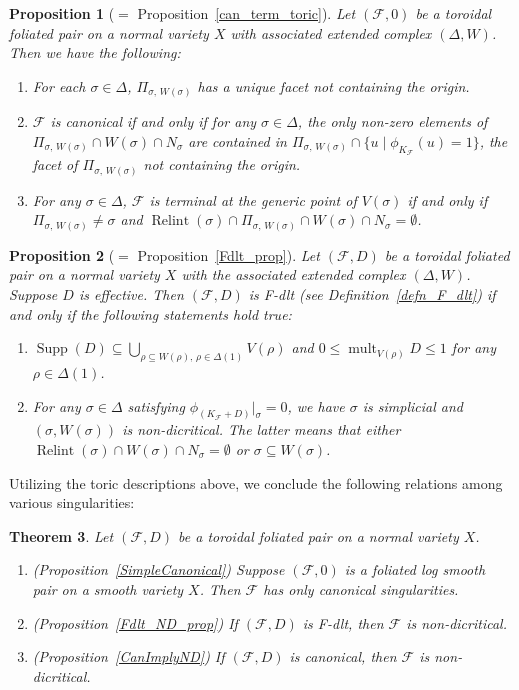 \documentclass[12pt,reqno]{amsart}
\newtheorem{theorem}{Theorem}[section]
\newtheorem{proposition}[theorem]{Proposition}
\theoremstyle{definition}
\newcommand{\on}{\operatorname}
\newcommand\cF{{\mathcal{F}}}
\begin{document}
\begin{proposition}[{$=$ Proposition~\ref{can_term_toric}}]
    Let $(\cF,0)$ be a toroidal foliated pair on a normal variety $X$ with associated extended complex $(\Delta,W)$. 
    Then we have the following:
    \begin{enumerate}
        \item For each $\sigma\in\Delta$, $\Pi_{\sigma,\,W(\sigma)}$ has a unique facet not containing the origin. 
        \item $\cF$ is canonical if and only if for any $\sigma\in\Delta$, the only non-zero elements of $\Pi_{\sigma,\,W(\sigma)}\cap W(\sigma)\cap N_\sigma$ are contained in $\Pi_{\sigma,\,W(\sigma)}\cap\{u\mid\phi_{K_\cF}(u)=1\}$, the facet of $\Pi_{\sigma,\,W(\sigma)}$ not containing the origin. 
        \item For any $\sigma\in\Delta$, $\cF$ is terminal at the generic point of $V(\sigma)$ if and only if $\Pi_{\sigma,\,W(\sigma)}\neq\sigma$ and $\on{Relint}(\sigma)\cap\Pi_{\sigma,\,W(\sigma)}\cap W(\sigma)\cap N_\sigma=\emptyset$. 
    \end{enumerate}
\end{proposition}

\begin{proposition}[{$=$ Proposition~\ref{Fdlt_prop}}]
    Let $(\cF,D)$ be a toroidal foliated pair on a normal variety $X$ with the associated extended complex $(\Delta,W)$. 
    Suppose $D$ is effective. 
    Then $(\cF,D)$ is F-dlt (see Definition~\ref{defn_F_dlt}) if and only if the following statements hold true:
    \begin{enumerate}
        \item $\on{Supp}(D)\subseteq\bigcup_{\rho\subseteq W(\rho),\,\rho\in\Delta(1)}V(\rho)$ and $0\leq\on{mult}_{V(\rho)}D\leq 1$ for any $\rho\in\Delta(1)$. 
        \item For any $\sigma\in\Delta$ satisfying $\phi_{(K_{\cF}+D)}\vert_\sigma=0$, we have $\sigma$ is simplicial and $(\sigma,W(\sigma))$ is non-dicritical. The latter means that either $\on{Relint}(\sigma)\cap W(\sigma)\cap N_\sigma=\emptyset$ or $\sigma\subseteq W(\sigma)$. 
    \end{enumerate}
\end{proposition}


Utilizing the toric descriptions above, we conclude the following relations among various singularities:
\begin{theorem}
    Let $(\cF,D)$ be a toroidal foliated pair on a normal variety $X$. 
    \begin{enumerate}
        \item (Proposition~\ref{SimpleCanonical}) Suppose $(\cF,0)$ is a foliated log smooth pair on a smooth variety $X$. 
        Then $\cF$ has only canonical singularities.
        \item (Proposition~\ref{Fdlt_ND_prop}) If $(\cF,D)$ is F-dlt, then $\cF$ is non-dicritical. 
        \item (Proposition~\ref{CanImplyND}) If $(\cF,D)$ is canonical, then $\cF$ is non-dicritical. 
    \end{enumerate}
\end{theorem}
\end{document}
